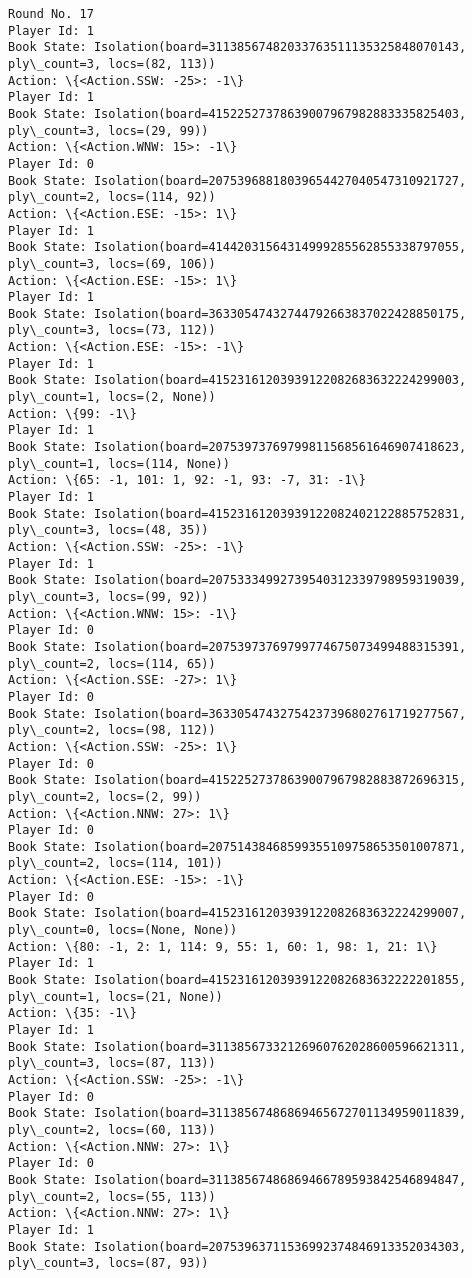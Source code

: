 \documentclass[11pt]{article}
\begin{document}
\begin{Verbatim}[commandchars=\\\{\}]
Round No. 17
Player Id: 1
Book State: Isolation(board=31138567482033763511135325848070143, ply\_count=3, locs=(82, 113))
Action: \{<Action.SSW: -25>: -1\}
Player Id: 1
Book State: Isolation(board=41522527378639007967982883335825403, ply\_count=3, locs=(29, 99))
Action: \{<Action.WNW: 15>: -1\}
Player Id: 0
Book State: Isolation(board=20753968818039654427040547310921727, ply\_count=2, locs=(114, 92))
Action: \{<Action.ESE: -15>: 1\}
Player Id: 1
Book State: Isolation(board=41442031564314999285562855338797055, ply\_count=3, locs=(69, 106))
Action: \{<Action.ESE: -15>: 1\}
Player Id: 1
Book State: Isolation(board=36330547432744792663837022428850175, ply\_count=3, locs=(73, 112))
Action: \{<Action.ESE: -15>: -1\}
Player Id: 1
Book State: Isolation(board=41523161203939122082683632224299003, ply\_count=1, locs=(2, None))
Action: \{99: -1\}
Player Id: 1
Book State: Isolation(board=20753973769799811568561646907418623, ply\_count=1, locs=(114, None))
Action: \{65: -1, 101: 1, 92: -1, 93: -7, 31: -1\}
Player Id: 1
Book State: Isolation(board=41523161203939122082402122885752831, ply\_count=3, locs=(48, 35))
Action: \{<Action.SSW: -25>: -1\}
Player Id: 1
Book State: Isolation(board=20753334992739540312339798959319039, ply\_count=3, locs=(99, 92))
Action: \{<Action.WNW: 15>: -1\}
Player Id: 0
Book State: Isolation(board=20753973769799774675073499488315391, ply\_count=2, locs=(114, 65))
Action: \{<Action.SSE: -27>: 1\}
Player Id: 0
Book State: Isolation(board=36330547432754237396802761719277567, ply\_count=2, locs=(98, 112))
Action: \{<Action.SSW: -25>: 1\}
Player Id: 0
Book State: Isolation(board=41522527378639007967982883872696315, ply\_count=2, locs=(2, 99))
Action: \{<Action.NNW: 27>: 1\}
Player Id: 0
Book State: Isolation(board=20751438468599355109758653501007871, ply\_count=2, locs=(114, 101))
Action: \{<Action.ESE: -15>: -1\}
Player Id: 0
Book State: Isolation(board=41523161203939122082683632224299007, ply\_count=0, locs=(None, None))
Action: \{80: -1, 2: 1, 114: 9, 55: 1, 60: 1, 98: 1, 21: 1\}
Player Id: 1
Book State: Isolation(board=41523161203939122082683632222201855, ply\_count=1, locs=(21, None))
Action: \{35: -1\}
Player Id: 1
Book State: Isolation(board=31138567332126960762028600596621311, ply\_count=3, locs=(87, 113))
Action: \{<Action.SSW: -25>: -1\}
Player Id: 0
Book State: Isolation(board=31138567486869465672701134959011839, ply\_count=2, locs=(60, 113))
Action: \{<Action.NNW: 27>: 1\}
Player Id: 0
Book State: Isolation(board=31138567486869466789593842546894847, ply\_count=2, locs=(55, 113))
Action: \{<Action.NNW: 27>: 1\}
Player Id: 1
Book State: Isolation(board=20753963711536992374846913352034303, ply\_count=3, locs=(87, 93))

\end{Verbatim}
\end{document}
